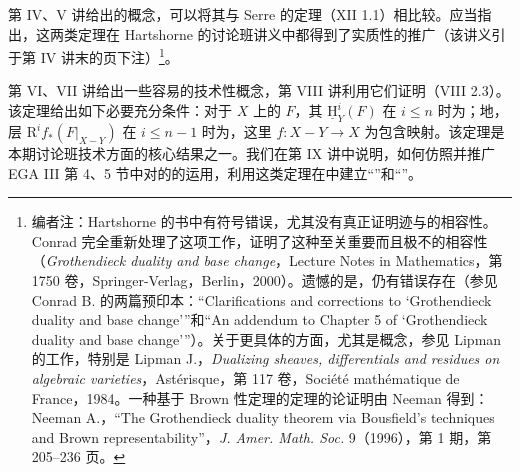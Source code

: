 第 IV、V 讲给出的概念，可以将其与 Serre 的定理（XII 1.1）相比较。应当指出，这两类定理在 Hartshorne 的讨论班讲义中都得到了实质性的推广（该讲义引于第 IV 讲末的页下注）\footnote[4]{编者注：Hartshorne 的书中有符号错误，尤其没有真正证明迹与的相容性。Conrad 完全重新处理了这项工作，证明了这种至关重要而且极不的相容性（\textit{Grothendieck duality and base change}，Lecture Notes in Mathematics，第 1750 卷，Springer-Verlag，Berlin，2000）。遗憾的是，仍有错误存在（参见 Conrad B. 的两篇预印本：“Clarifications and corrections to `Grothendieck duality and base change'”和“An addendum to Chapter 5 of `Grothendieck duality and base change'”）。关于更具体的方面，尤其是概念，参见 Lipman 的工作，特别是 Lipman J.，\textit{Dualizing sheaves, differentials and residues on algebraic varieties}，Astérisque，第 117 卷，Société mathématique de France，1984。一种基于 Brown 性定理的定理的论证明由 Neeman 得到：Neeman A.，“The Grothendieck duality theorem via Bousfield's techniques and Brown representability”，\textit{J. Amer. Math. Soc.} 9（1996），第 1 期，第 205--236 页。}。

第 VI、VII 讲给出一些容易的技术性概念，第 VIII 讲利用它们证明（VIII 2.3）。该定理给出如下必要充分条件：对于 $X$ 上的 $F$，其 $\underline{\mathrm{H}}^{i}_{Y}(F)$ 在 $i\leq n$ 时为；地，层 $\mathrm{R}^{i}f_{*}(F|_{X-Y})$ 在 $i\leq n-1$ 时为，这里 $f\colon X-Y\longrightarrow X$ 为包含映射。该定理是本期讨论班技术方面的核心结果之一。我们在第 IX 讲中说明，如何仿照并推广 EGA III 第 4、5 节中对的的运用，利用这类定理在中建立“”和“”。

